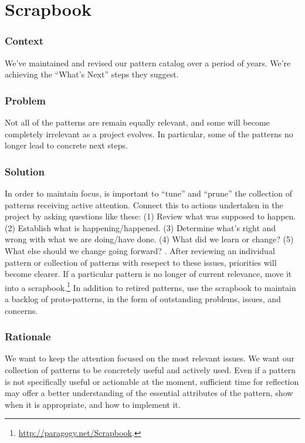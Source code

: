 \section{Scrapbook} \label{sec:Scrapbook}

\subsubsection*{Context} We've maintained and revised our pattern catalog over a period of years.  We're achieving
the ``What's Next'' steps they suggest.

\subsubsection*{Problem} Not all of the patterns are remain equally relevant, and some will become completely irrelevant as a project evolves.  In particular, some of the patterns no longer lead to concrete next steps.

\subsubsection*{Solution} In order to maintain focus, is important to ``tune'' and ``prune'' the collection of patterns receiving active attention.  Connect this to actions undertaken in the project by asking questions like these:
(1) Review what was supposed to happen.
(2) Establish what is happening/happened.
(3) Determine what’s right and wrong with what we are doing/have done.
(4) What did we learn or change? 
(5) What else should we change going forward?  \cite[Chapter 28]{peeragogy-handbook}.
%
After reviewing an individual pattern or collection of patterns with
resepect to these issues, priorities will become clearer.  If a
particular pattern is no longer of current relevance, move it into a
scrapbook.\footnote{\url{http://paragogy.net/Scrapbook}.}  In
addition to retired patterns, use the scrapbook to maintain a
backlog of proto-patterns, in the form of outstanding problems, issues,
and concerns.

\subsubsection*{Rationale} We want to keep the attention focused on the most relevant issues.
We want our collection of patterns to be concretely useful and actively used.
Even if a pattern is not specifically useful or actionable at the
moment, sufficient time for reflection may offer a better
understanding of the essential attributes of the pattern, show when it
is appropriate, and how to implement it.

